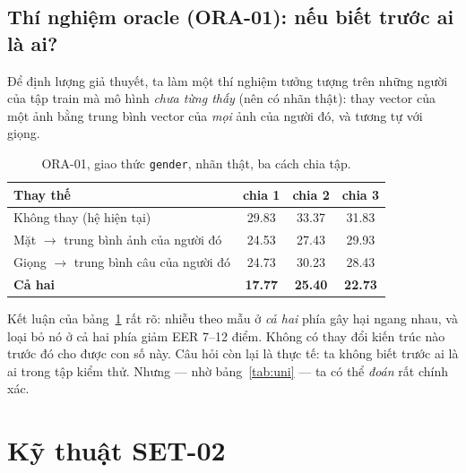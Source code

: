\documentclass[11pt,a4paper]{article}
\begin{document}
\subsection{Thí nghiệm oracle (ORA-01): nếu biết trước ai là ai?}

Để định lượng giả thuyết, ta làm một thí nghiệm tưởng tượng trên những người của tập train mà mô hình \emph{chưa từng thấy} (nên có nhãn thật): thay vector của một ảnh bằng trung bình vector của \emph{mọi} ảnh của người đó, và tương tự với giọng.

\begin{table}[h]
\centering
\caption{ORA-01, giao thức \texttt{gender}, nhãn thật, ba cách chia tập.}
\label{tab:oracle}
\begin{tabular}{lccc}
\toprule
Thay thế & chia 1 & chia 2 & chia 3 \\
\midrule
Không thay (hệ hiện tại) & 29.83 & 33.37 & 31.83 \\
Mặt $\to$ trung bình ảnh của người đó & 24.53 & 27.43 & 29.93 \\
Giọng $\to$ trung bình câu của người đó & 24.73 & 30.23 & 28.43 \\
\textbf{Cả hai} & \textbf{17.77} & \textbf{25.40} & \textbf{22.73} \\
\bottomrule
\end{tabular}
\end{table}

Kết luận của bảng~\ref{tab:oracle} rất rõ: nhiễu theo mẫu ở \emph{cả hai} phía gây hại ngang nhau, và loại bỏ nó ở cả hai phía giảm EER 7--12 điểm. Không có thay đổi kiến trúc nào trước đó cho được con số này. Câu hỏi còn lại là thực tế: ta không biết trước ai là ai trong tập kiểm thử. Nhưng --- nhờ bảng~\ref{tab:uni} --- ta có thể \emph{đoán} rất chính xác.

\section{Kỹ thuật SET-02}
\end{document}
